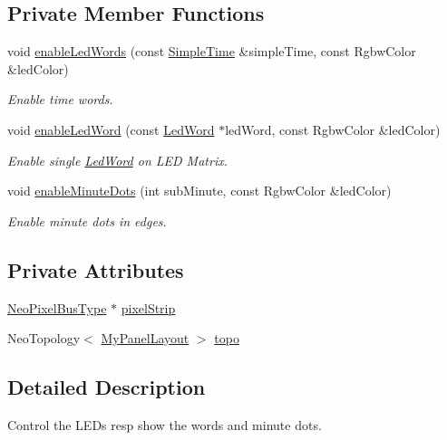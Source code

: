\subsection*{Private Member Functions}
\begin{DoxyCompactItemize}
\item 
void \mbox{\hyperlink{class_led_control_module_ac2e92014634c3cbfbcecff4473f39dac}{enable\+Led\+Words}} (const \mbox{\hyperlink{class_simple_time}{Simple\+Time}} \&simple\+Time, const Rgbw\+Color \&led\+Color)
\begin{DoxyCompactList}\small\item\em Enable time words. \end{DoxyCompactList}\item 
void \mbox{\hyperlink{class_led_control_module_a5870c6c37010e51f6b3dbe4611a1c05c}{enable\+Led\+Word}} (const \mbox{\hyperlink{class_led_word}{Led\+Word}} $\ast$led\+Word, const Rgbw\+Color \&led\+Color)
\begin{DoxyCompactList}\small\item\em Enable single \mbox{\hyperlink{class_led_word}{Led\+Word}} on L\+ED Matrix. \end{DoxyCompactList}\item 
void \mbox{\hyperlink{class_led_control_module_a6c8c6fcd7dc688fb8c14933f418488ed}{enable\+Minute\+Dots}} (int sub\+Minute, const Rgbw\+Color \&led\+Color)
\begin{DoxyCompactList}\small\item\em Enable minute dots in edges. \end{DoxyCompactList}\end{DoxyCompactItemize}
\subsection*{Private Attributes}
\begin{DoxyCompactItemize}
\item 
\mbox{\hyperlink{_led_control_module_8h_a51a7b766d62733fca1ec20e82e024f9f}{Neo\+Pixel\+Bus\+Type}} $\ast$ \mbox{\hyperlink{class_led_control_module_a9d427e447c0cfb34b154f464e7682e14}{pixel\+Strip}}
\item 
Neo\+Topology$<$ \mbox{\hyperlink{_led_control_module_8h_a49b2323848e516b3241e758de64f0b3b}{My\+Panel\+Layout}} $>$ \mbox{\hyperlink{class_led_control_module_a0b71b57d3f564529c89be8877dbfaa6b}{topo}}
\end{DoxyCompactItemize}


\subsection{Detailed Description}
Control the L\+E\+Ds resp show the words and minute dots. 

